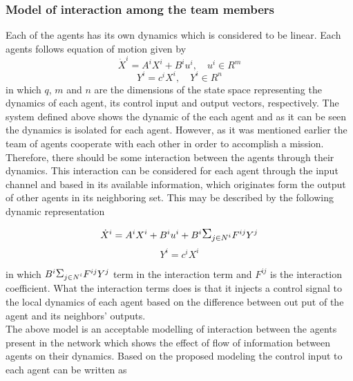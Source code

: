 \documentclass[conference]{IEEEtran}
\begin{document}
\subsubsection{Model of interaction among the team members}

Each of the agents has its own dynamics which is considered to be linear. Each agents follows equation of motion given by
\begin{equation}\label{eq:agentEquation}
\dot{X}^{i}=A^{i}X^{i}+B^{i}u^{i}, \quad u^{i}\in R^{m}
\end{equation}
\begin{equation}\label{eq:agentEquationOutput}
Y^{i}=c^{i}X^{i}, \quad Y^{i}\in R^{n}
\end{equation}
in which $q$, $m$ and $n$ are the dimensions of the state space representing the dynamics of each agent, its control input and output vectors, respectively. The system defined above shows the dynamic of the each agent and as it can be seen the dynamics is isolated for each agent. However, as it was mentioned earlier the team of agents cooperate with each other in order to accomplish a mission. Therefore, there should be some interaction between the agents through their dynamics. This interaction can be considered for each agent through the input channel and based in its available information, which originates form the output of other agents in its neighboring set. This may be described by the following dynamic representation

\begin{equation}\label{eq:agentEquationMod}
\dot{X}^{i}=A^{i}X^{i}+B^{i}u^{i}+B^{i}\mathlarger{\mathlarger{\Sigma}}_{j \in N^{i}} F^{ij}Y^{j}
\end{equation}
\begin{equation}\label{eq:agentEquationOutputMod}
Y^{i}=c^{i}X^{i}
\end{equation}

in which $B^{i}\mathlarger{\mathlarger{\Sigma}}_{j \in N^{i}} F^{ij}Y^{j}$  term in the interaction term and $F^{ij}$ is the interaction coefficient. What the interaction terms does is that it injects a control signal to the local dynamics of each agent based on the difference between out put of the agent and its neighbors' outputs.\\
The above model is an acceptable modelling of interaction between the agents present in the network which shows the effect of flow of information between agents on their dynamics. Based on the proposed modeling the control input to each agent can be written as
\end{document}
